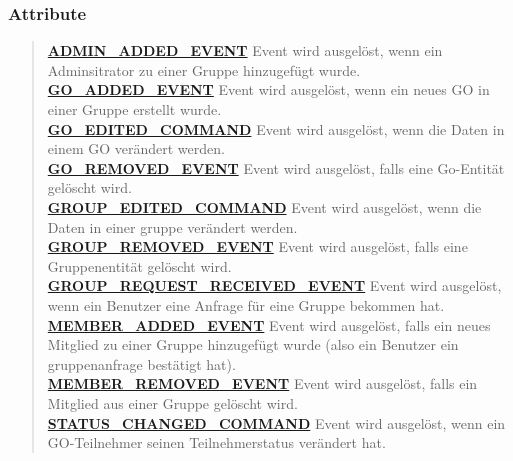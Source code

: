 \documentclass[11pt,a4paper]{article}
\begin{document}
{{{{{{{{{{{{{{{\subsubsection{Attribute}{
\begin{verse}
\hyperlink{edu.kit.pse17.go_app.ClientCommunication.Downstream.EventArg.ADMIN_ADDED_EVENT}{{\bf ADMIN\_ADDED\_EVENT}} Event wird ausgelöst, wenn ein Adminsitrator zu einer Gruppe hinzugefügt wurde.\\
\hyperlink{edu.kit.pse17.go_app.ClientCommunication.Downstream.EventArg.GO_ADDED_EVENT}{{\bf GO\_ADDED\_EVENT}} Event wird ausgelöst, wenn ein neues GO in einer Gruppe erstellt wurde.\\
\hyperlink{edu.kit.pse17.go_app.ClientCommunication.Downstream.EventArg.GO_EDITED_COMMAND}{{\bf GO\_EDITED\_COMMAND}} Event wird ausgelöst, wenn die Daten in einem GO verändert werden.\\
\hyperlink{edu.kit.pse17.go_app.ClientCommunication.Downstream.EventArg.GO_REMOVED_EVENT}{{\bf GO\_REMOVED\_EVENT}} Event wird ausgelöst, falls eine Go-Entität gelöscht wird.\\
\hyperlink{edu.kit.pse17.go_app.ClientCommunication.Downstream.EventArg.GROUP_EDITED_COMMAND}{{\bf GROUP\_EDITED\_COMMAND}} Event wird ausgelöst, wenn die Daten in einer gruppe verändert werden.\\
\hyperlink{edu.kit.pse17.go_app.ClientCommunication.Downstream.EventArg.GROUP_REMOVED_EVENT}{{\bf GROUP\_REMOVED\_EVENT}} Event wird ausgelöst, falls eine Gruppenentität gelöscht wird.\\
\hyperlink{edu.kit.pse17.go_app.ClientCommunication.Downstream.EventArg.GROUP_REQUEST_RECEIVED_EVENT}{{\bf GROUP\_REQUEST\_RECEIVED\_EVENT}} Event wird ausgelöst, wenn ein Benutzer eine Anfrage für eine Gruppe bekommen hat.\\
\hyperlink{edu.kit.pse17.go_app.ClientCommunication.Downstream.EventArg.MEMBER_ADDED_EVENT}{{\bf MEMBER\_ADDED\_EVENT}} Event wird ausgelöst, falls ein neues Mitglied zu einer Gruppe hinzugefügt wurde (also ein Benutzer ein gruppenanfrage bestätigt hat).\\
\hyperlink{edu.kit.pse17.go_app.ClientCommunication.Downstream.EventArg.MEMBER_REMOVED_EVENT}{{\bf MEMBER\_REMOVED\_EVENT}} Event wird ausgelöst, falls ein Mitglied aus einer Gruppe gelöscht wird.\\
\hyperlink{edu.kit.pse17.go_app.ClientCommunication.Downstream.EventArg.STATUS_CHANGED_COMMAND}{{\bf STATUS\_CHANGED\_COMMAND}} Event wird ausgelöst, wenn ein GO-Teilnehmer seinen Teilnehmerstatus verändert hat.\\
\end{verse}
}
}}}}}}}}}}}}}}}
\end{document}
